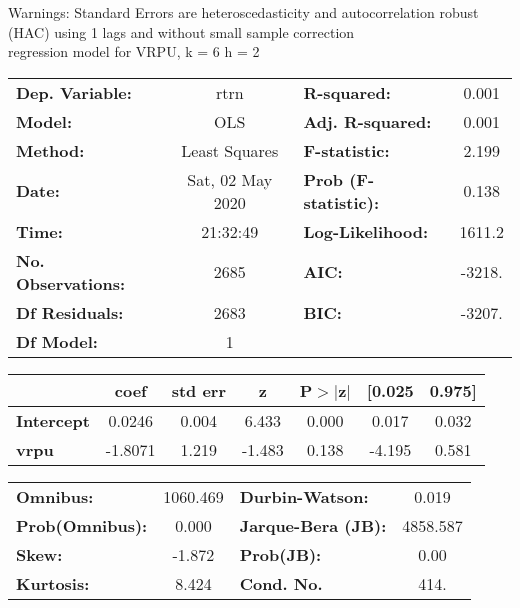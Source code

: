 Warnings: \newline
 [1] Standard Errors are heteroscedasticity and autocorrelation robust (HAC) using 1 lags and without small sample correction\\ 

regression model for VRPU, k = 6 h = 2\begin{center}
\begin{tabular}{lclc}
\toprule
\textbf{Dep. Variable:}    &       rtrn       & \textbf{  R-squared:         } &     0.001   \\
\textbf{Model:}            &       OLS        & \textbf{  Adj. R-squared:    } &     0.001   \\
\textbf{Method:}           &  Least Squares   & \textbf{  F-statistic:       } &     2.199   \\
\textbf{Date:}             & Sat, 02 May 2020 & \textbf{  Prob (F-statistic):} &    0.138    \\
\textbf{Time:}             &     21:32:49     & \textbf{  Log-Likelihood:    } &    1611.2   \\
\textbf{No. Observations:} &        2685      & \textbf{  AIC:               } &    -3218.   \\
\textbf{Df Residuals:}     &        2683      & \textbf{  BIC:               } &    -3207.   \\
\textbf{Df Model:}         &           1      & \textbf{                     } &             \\
\bottomrule
\end{tabular}
\begin{tabular}{lcccccc}
                   & \textbf{coef} & \textbf{std err} & \textbf{z} & \textbf{P$> |$z$|$} & \textbf{[0.025} & \textbf{0.975]}  \\
\midrule
\textbf{Intercept} &       0.0246  &        0.004     &     6.433  &         0.000        &        0.017    &        0.032     \\
\textbf{vrpu}      &      -1.8071  &        1.219     &    -1.483  &         0.138        &       -4.195    &        0.581     \\
\bottomrule
\end{tabular}
\begin{tabular}{lclc}
\textbf{Omnibus:}       & 1060.469 & \textbf{  Durbin-Watson:     } &    0.019  \\
\textbf{Prob(Omnibus):} &   0.000  & \textbf{  Jarque-Bera (JB):  } & 4858.587  \\
\textbf{Skew:}          &  -1.872  & \textbf{  Prob(JB):          } &     0.00  \\
\textbf{Kurtosis:}      &   8.424  & \textbf{  Cond. No.          } &     414.  \\
\bottomrule
\end{tabular}
\end{center}

